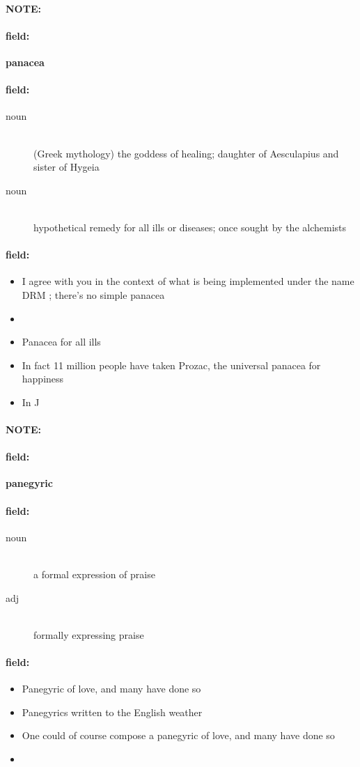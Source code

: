 \documentclass[12pt]{article}
\newenvironment{note}{\paragraph{NOTE:}}{}
\newenvironment{field}{\paragraph{field:}}{}
\begin{document}
\begin{note}
\begin{field}
\textbf{\large panacea}
\end{field}


\begin{field}
\begin{description}
\item[noun] \hfill \\ 
(Greek mythology) the goddess of healing; daughter of Aesculapius and sister of Hygeia

\item[noun] \hfill \\ 
hypothetical remedy for all ills or diseases; once sought by the alchemists

\end{description}
\end{field}

\begin{field}
\begin{itemize}
\item I agree with you in the context of what is being implemented under the name DRM ; there's no simple panacea
\item 
\item Panacea for all ills
\item In fact 11 million people have taken Prozac, the universal panacea for happiness
\item In J
\end{itemize}
\end{field}
\end{note}
\begin{note}
\begin{field}
\textbf{\large panegyric}
\end{field}


\begin{field}
\begin{description}
\item[noun] \hfill \\ 
a formal expression of praise

\item[adj] \hfill \\ 
formally expressing praise

\end{description}
\end{field}

\begin{field}
\begin{itemize}
\item Panegyric of love, and many have done so
\item Panegyrics written to the English weather
\item One could of course compose a panegyric of love, and many have done so
\item 
\end{itemize}
\end{field}
\end{note}
\end{document}
